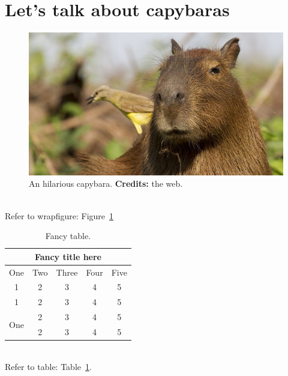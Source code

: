 \documentclass[1-ambra-tesi.tex]{subfiles}
\begin{document}
\label{sub:chapter3}

\begin{chapabstract}
\small{\lipsum[1]}\\

\begin{center}
    \noindent\makebox[0.8\linewidth]{\rule{0.8\paperwidth}{0.4pt}}
\end{center}
\vspace{2cm}
\end{chapabstract}



\lipsum[2]

\section{Let's talk about capybaras}
\label{sec:capybaras}

\begin{figure}
\centering
\captionsetup{width=\linewidth}
\includegraphics[width=\linewidth]{images/capybara.jpeg}
\caption{An hilarious capybara. \textbf{Credits:} the web.}
\label{fig:capybara}
\end{figure}

\lipsum[3]
\lipsum[4]\\

Refer to wrapfigure: Figure~\ref{fig:capybara}\\

\lipsum[5]

\begin{table}[ht]
    \centering
    \begin{tabular}{|c|c|c|c|c|}
    \multicolumn{5}{c}{\textbf{Fancy title here}}\\
    \hline
    \hline
    One                  & Two & Three & Four & Five \\
    \hline
    1                    & 2   & 3     & 4   & 5     \\
    1                    & 2   & 3     & 4   & 5     \\
    \hline
    \multirow{2}{*}{One} & 2   & 3     & 4   & 5     \\
                         & 2   & 3     & 4   & 5     \\
    \hline
    \end{tabular}
\caption{Fancy table.}
\label{tab:capybara}
\end{table}

\lipsum[6]\\

Refer to table: Table~\ref{tab:capybara}.\\

\lipsum[7]
\end{document}
